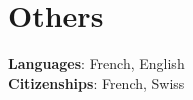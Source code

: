 \documentclass[letterpaper,10pt]{article}
\begin{document}
\section{Others}
\begin{itemize}[leftmargin=0.15in, label={}]
\small{\item{
\textbf{Languages}{: French, English} \\
\textbf{Citizenships}{: French, Swiss}\\
}}
\end{itemize}
\end{document}
